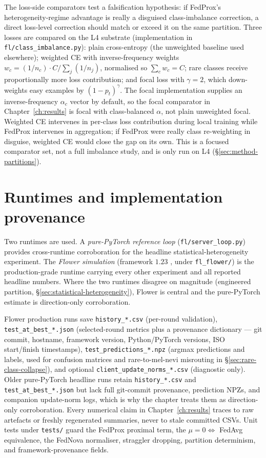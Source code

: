 \documentclass[11pt,a4paper]{report}
\begin{document}
The loss-side comparators test a falsification hypothesis: if FedProx's
heterogeneity-regime advantage is really a disguised class-imbalance
correction, a direct loss-level correction should match or exceed it on
the same partition. Three losses are compared on the L4 substrate
(implementation in \texttt{fl/class\_imbalance.py}): plain cross-entropy
(the unweighted baseline used elsewhere); weighted CE with
inverse-frequency weights $w_c = (1/n_c) \cdot C / \sum_j (1/n_j)$,
normalised so $\sum_c w_c = C$; rare classes receive proportionally
more loss contribution; and focal loss \citep{lin2017focal} with
$\gamma = 2$,
which down-weights easy examples by $(1 - p_t)^{\gamma}$. The focal
implementation supplies an inverse-frequency $\alpha_c$ vector by
default, so the focal comparator in Chapter~\ref{ch:results} is focal
with class-balanced $\alpha$, not plain unweighted focal. Weighted CE
intervenes in per-class loss contribution during local training while
FedProx intervenes in aggregation; if FedProx were really class
re-weighting in disguise, weighted CE would close the gap on its own.
This is a focused comparator set, not a full imbalance study, and is
only run on L4 (§\ref{sec:method-partitions}).

\section{Runtimes and implementation provenance}
\label{sec:method-runtimes}

Two runtimes are used. A \emph{pure-PyTorch reference loop}
(\texttt{fl/server\_loop.py}) provides cross-runtime corroboration for
the headline statistical-heterogeneity experiment. The
\emph{Flower simulation} (framework $1.23$ \citep{beutel2020flower},
under \texttt{fl\_flower/}) is the production-grade runtime carrying
every other experiment and all reported headline numbers. Where the
two runtimes disagree on magnitude (engineered partition,
§\ref{sec:statistical-heterogeneity}), Flower is central and the
pure-PyTorch estimate is direction-only corroboration.

Flower production runs save \texttt{history\_*.csv} (per-round
validation), \texttt{test\_at\_best\_*.json} (selected-round metrics
plus a provenance dictionary --- git commit, hostname, framework
version, Python/PyTorch versions, ISO start/finish timestamps),
\texttt{test\_predictions\_*.npz} (argmax predictions and labels, used
for confusion matrices and rare-to-mel-nevi misrouting in
§\ref{sec:rare-class-collapse}), and optional
\texttt{client\_update\_norms\_*.csv} (diagnostic only). Older
pure-PyTorch headline runs retain \texttt{history\_*.csv} and
\texttt{test\_at\_best\_*.json} but lack full git-commit provenance,
prediction NPZs, and companion update-norm logs, which is why the
chapter treats them as direction-only corroboration. Every numerical
claim in Chapter~\ref{ch:results} traces to raw artefacts or freshly
regenerated summaries, never to stale committed CSVs. Unit tests under
\texttt{tests/} guard the FedProx proximal term, the
$\mu = 0 \Leftrightarrow$ FedAvg equivalence, the FedNova normaliser,
straggler dropping, partition determinism, and framework-provenance
fields.
\end{document}

